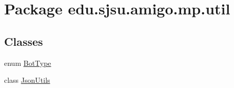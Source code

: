 \hypertarget{namespaceedu_1_1sjsu_1_1amigo_1_1mp_1_1util}{}\section{Package edu.\+sjsu.\+amigo.\+mp.\+util}
\label{namespaceedu_1_1sjsu_1_1amigo_1_1mp_1_1util}
\subsection*{Classes}
\begin{DoxyCompactItemize}
\item 
enum \hyperlink{enumedu_1_1sjsu_1_1amigo_1_1mp_1_1util_1_1_bot_type}{Bot\+Type}
\item 
class \hyperlink{classedu_1_1sjsu_1_1amigo_1_1mp_1_1util_1_1_json_utils}{Json\+Utils}
\end{DoxyCompactItemize}
